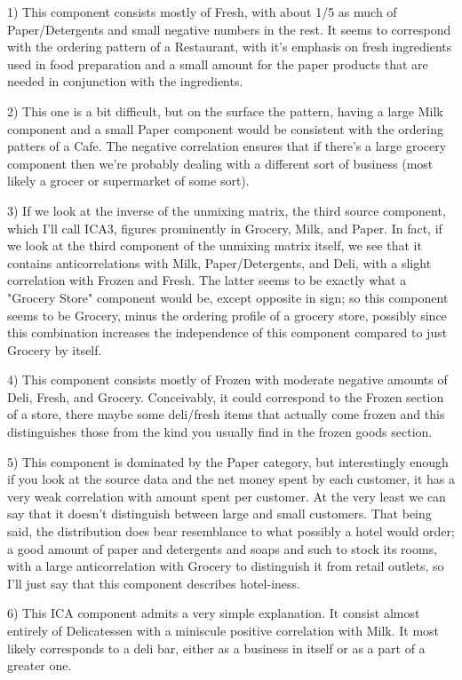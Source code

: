 \documentclass{article}
\begin{document}
1) This component consists mostly of Fresh, with about 1/5 as much of Paper/Detergents and small negative numbers in the rest.  It seems to correspond with the ordering pattern of a Restaurant, with it's emphasis on fresh ingredients used in food preparation and a small amount for the paper products that are needed in conjunction with the ingredients.

2) This one is a bit difficult, but on the surface the pattern, having a large Milk component and a small Paper component would be consistent with the ordering patters of a Cafe.  The negative correlation ensures that if there's a large grocery component then we're probably dealing with a different sort of business (most likely a grocer or supermarket of some sort).

3) If we look at the inverse of the unmixing matrix, the third source component, which I'll call ICA3, figures prominently in Grocery, Milk, and Paper.  In fact, if we look at the third component of the unmixing matrix itself, we see that it contains anticorrelations with Milk, Paper/Detergents, and Deli, with a slight correlation with Frozen and Fresh.  The latter seems to be exactly what a "Grocery Store" component would be, except opposite in sign; so this component seems to be Grocery, minus the ordering profile of a grocery store, possibly since this combination increases the independence of this component compared to just Grocery by itself.

4) This component consists mostly of Frozen with moderate negative amounts of Deli, Fresh, and Grocery.  Conceivably, it could correspond to the Frozen section of a store, there maybe some deli/fresh items that actually come frozen and this distinguishes those from the kind you usually find in the frozen goods section.

5) This component is dominated by the Paper category, but interestingly enough if you look at the source data and the net money spent by each customer, it has a very weak correlation with amount spent per customer.  At the very least we can say that it doesn't distinguish between large and small customers.  That being said, the distribution does bear resemblance to what possibly a hotel would order; a good amount of paper and detergents and soaps and such to stock its rooms, with a large anticorrelation with Grocery to distinguish it from retail outlets, so I'll just say that this component describes hotel-iness.  

6) This ICA component admits a very simple explanation.  It consist almost entirely of Delicatessen with a miniscule positive correlation with Milk.  It most likely corresponds to a deli bar, either as a business in itself or as a part of a greater one.  
\end{document}

